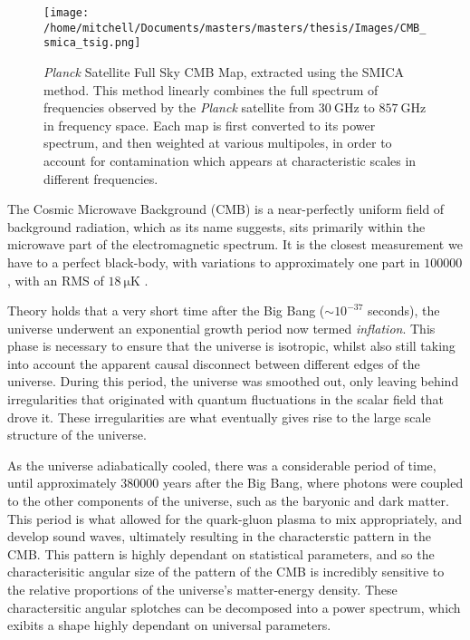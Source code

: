 \begin{figure}[ht]
	\centering
	\texttt{[image: /home/mitchell/Documents/masters/masters/thesis/Images/CMB\_smica\_tsig.png]}
	\label{CMB Map}
	\caption{\emph{Planck} Satellite Full Sky CMB Map, extracted using the SMICA method. This  method linearly combines the full spectrum of frequencies observed by the \emph{Planck} satellite from $\SI{30}{\giga\hertz}$ to $\SI{857}{\giga\hertz}$ in frequency space. Each map is first converted to its power spectrum, and then weighted at various multipoles, in order to account for contamination which appears at characteristic scales in different frequencies.}
\end{figure}

The Cosmic Microwave Background (CMB) is a near-perfectly uniform field of background radiation, which as its name suggests, sits primarily within the microwave part of the electromagnetic spectrum. It is the closest measurement we have to a perfect black-body, with variations to approximately one part in $100000$, with an RMS of $\SI{18}{\micro\kelvin}$ \cite{2004mmu..symp..291W}. 

Theory holds that a very short time after the Big Bang ($\sim 10^{-37}$ seconds), the universe underwent an exponential growth period now termed \textit{inflation}. This phase is necessary to ensure that the universe is isotropic, whilst also still taking into account the apparent causal disconnect between different edges of the universe. During this period, the universe was smoothed out, only leaving behind irregularities that originated with quantum fluctuations in the scalar field that drove it. These irregularities are what eventually gives rise to the large scale structure of the universe. 

As the universe adiabatically cooled, there was a considerable period of time, until approximately $380000$ years after the Big Bang, where photons were coupled to the other components of the universe, such as the baryonic and dark matter. This period is what allowed for the quark-gluon plasma to mix appropriately, and develop sound waves, ultimately resulting in the characterstic pattern in the CMB. This pattern is highly dependant on statistical parameters, and so the characterisitic angular size of the pattern of the CMB is incredibly sensitive to the relative proportions of the universe's matter-energy density. These charactersitic angular splotches can be decomposed into a power spectrum, which exibits a shape highly dependant on universal parameters.

